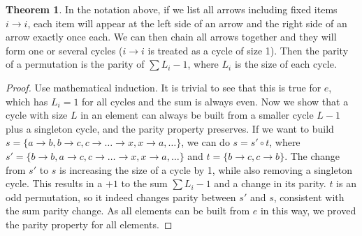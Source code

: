 \documentclass[]{article}
\theoremstyle{definition}\newtheorem{theorem}{Theorem}
\begin{document}
\begin{theorem}
	\label{cycle-parity}
	In the notation above, if we list all arrows including fixed items $i\rightarrow i$, each item will appear at the left side of an arrow and the right side of an arrow exactly once each. We can then chain all arrows together and they will form one or several cycles ($i\rightarrow i$ is treated as a cycle of size 1). Then the parity of a permutation is the parity of $\sum L_i - 1$, where $L_i$ is the size of each cycle.
\end{theorem}
\begin{proof}
	Use mathematical induction. It is trivial to see that this is true for $e$, which has $L_i = 1 $ for all cycles and the sum is always even. Now we show that a cycle with size $L$ in an element can always be built from a smaller cycle $L - 1$ plus a singleton cycle, and the parity property preserves. If we want to build $s = \{a\rightarrow b, b\rightarrow c, c\rightarrow\dots\rightarrow x, x\rightarrow a, \dots\}$, we can do $s = s' \circ t$, where $s' = \{b\rightarrow b, a\rightarrow  c, c\rightarrow\dots\rightarrow x, x\rightarrow a, \dots \}$ and $t = \{b\rightarrow c, c\rightarrow b\}$. The change from $s'$ to $s$ is increasing the size of a cycle by 1, while also removing a singleton cycle. This results in a $+1$ to the sum $\sum L_i - 1$ and a change in its parity. $t$ is an odd permutation, so it indeed changes parity between $s'$ and $s$, consistent with the sum parity change. As all elements can be built from $e$ in this way, we proved the parity property for all elements.
\end{proof}
	
\end{document}
